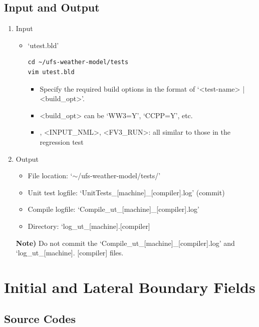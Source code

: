 \documentclass[11pt,fleqn]{report}              %
\begin{document}
\subsection{Input and Output}

\begin{enumerate}
\item Input
\begin{itemize}
\item `utest.bld'
\lstset{language=bash}   
\begin{lstlisting}[frame=trBL]
cd ~/ufs-weather-model/tests
vim utest.bld
\end{lstlisting}
\begin{itemize}
\item Specify the required build options in the format of `<test-name> | <build\_opt>'.
\item <build\_opt> can be `WW3=Y', `CCPP=Y', etc.
\item <test-name>, <INPUT\_NML>, <FV3\_RUN>: all similar to those in the regression test
\end{itemize}
\end{itemize}

\item Output
\begin{itemize}
\item File location: `$\sim$/ufs-weather-model/tests/'
\item Unit test logfile: `UnitTests\_[machine]\_[compiler].log' (commit)
\item Compile logfile: `Compile\_ut\_[machine]\_[compiler].log'
\item Directory: `log\_ut\_[machine].[compiler]
\end{itemize}

{\bf Note)} Do not commit the `Compile\_ut\_[machine]\_[compiler].log' and `log\_ut\_[machine]. [compiler] files.

\end{enumerate}




\section{Initial and Lateral Boundary Fields}
\label{sec:dev_sar_icbc}

\subsection{Source Codes}
\end{document}

